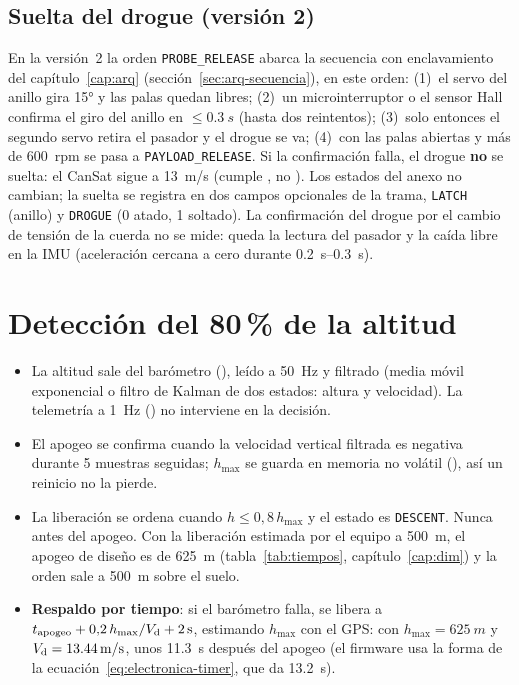 \subsection{Suelta del drogue (versión 2)}\label{sec:elec-suelta}
En la versión~2 la orden \texttt{PROBE\_RELEASE} abarca la secuencia con enclavamiento del
capítulo~\ref{cap:arq} (sección~\ref{sec:arq-secuencia}), en este orden: (1)~el servo del
anillo gira \ang{15} y las palas quedan libres; (2)~un microinterruptor o el sensor Hall
confirma el giro del anillo en $\le\SI{0.3}{s}$ (hasta dos reintentos); (3)~solo entonces el segundo
servo retira el pasador y el drogue se va; (4)~con las palas abiertas y más de
\SI{600}{rpm} se pasa a \texttt{PAYLOAD\_RELEASE}. Si la confirmación falla, el drogue \textbf{no} se
suelta: el CanSat sigue a \SI{13}{m/s} (cumple , no ). Los estados del anexo no
cambian; la suelta se registra en dos campos opcionales de la trama, \texttt{LATCH} (anillo) y
\texttt{DROGUE} (0 atado, 1 soltado). La confirmación del drogue por el cambio de tensión de la
cuerda no se mide: queda la lectura del pasador y la caída libre en la IMU (aceleración
cercana a cero durante \SIrange{0.2}{0.3}{s}).

\section{Detección del \texorpdfstring{80\,\%}{80 \%} de la altitud}
\begin{itemize}
  \item La altitud sale del barómetro (), leído a \SI{50}{Hz} y filtrado (media
        móvil exponencial o filtro de Kalman de dos estados: altura y velocidad). La
        telemetría a \SI{1}{Hz} () no interviene en la decisión.
  \item El apogeo se confirma cuando la velocidad vertical filtrada es negativa durante 5
        muestras seguidas; $h_{\max}$ se guarda en memoria no volátil (), así un
        reinicio no la pierde.
  \item La liberación se ordena cuando $h\le0{,}8\,h_{\max}$ y el estado es
        \texttt{DESCENT}. Nunca antes del apogeo. Con la liberación estimada por el equipo a
        \SI{500}{m}, el apogeo de diseño es de \SI{625}{m} (tabla~\ref{tab:tiempos},
        capítulo~\ref{cap:dim}) y la orden sale a \SI{500}{m} sobre el suelo.
  \item \textbf{Respaldo por tiempo}: si el barómetro falla, se libera a
        $t_{\text{apogeo}}+0{,}2\,h_{\max}/V_{\mathrm{d}}+\SI{2}{s}$, estimando $h_{\max}$ con el GPS: con
        $h_{\max}=\SI{625}{m}$ y $V_{\mathrm{d}}=\SI{13.44}{m/s}$, unos \SI{11.3}{s} después del apogeo
        (el firmware usa la forma de la ecuación~\ref{eq:electronica-timer}, que da
        \SI{13.2}{s}).
\end{itemize}

